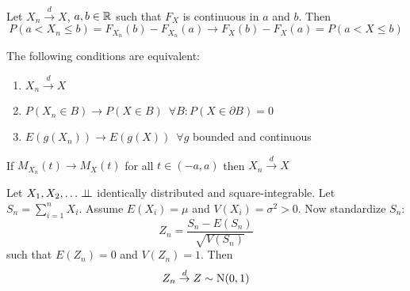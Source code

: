 \documentclass[12pt]{extarticle}
\newcommand{\Normal}{{\operatorfont N}}
\begin{document}
\begin{proposition}
    Let $X_n \stackrel{d}{\to} X$, $a, b \in \mathbb{R}$ such that $F_X$ is continuous in $a$ and $b$.
    Then
    \begin{equation}
        P(a < X_n \leq b) = F_{X_n}(b) - F_{X_n}(a) \to F_X(b) - F_X(a) = P(a < X \leq b)
    \end{equation}
\end{proposition}

\begin{theorem}
    The following conditions are equivalent:
    \begin{enumerate}
        \item $X_n \stackrel{d}{\to} X$
        \item $P(X_n \in B) \to P(X \in B) \enspace \forall B: P(X \in \partial B) = 0$
        \item $E(g(X_n)) \to E(g(X)) \enspace \forall g$ bounded and continuous
    \end{enumerate}
\end{theorem}

\begin{theorem}
    If $M_{X_n}(t) \to M_X(t)$ for all $t \in (-a, a)$ then $X_n \stackrel{d}{\to} X$
\end{theorem}

\begin{theorem}
    Let $X_1, X_2, \ldots \perp \!\!\! \perp$ identically distributed and square-integrable.
    Let $S_n = \sum_{i = 1}^n X_i$.
    Assume $E(X_i) = \mu$ and $V(X_i) = \sigma^2 > 0$.
    Now standardize $S_n$:
    \begin{equation}
        Z_n = \frac{S_n - E(S_n)}{\sqrt{V(S_n)}}
    \end{equation}
    such that $E(Z_n) = 0$ and $V(Z_n) = 1$.
    Then
    \begin{equation}
        Z_n \stackrel{d}{\to} Z \sim \Normal(0, 1)
    \end{equation}
\end{theorem}
\end{document}
